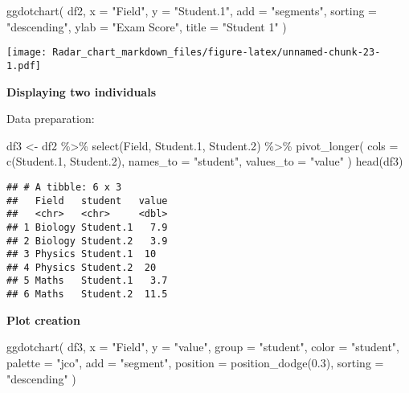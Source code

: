 \documentclass[
]{article}
\newenvironment{Shaded}{\begin{snugshade}}{\end{snugshade}}
\newcommand{\AttributeTok}[1]{\textcolor[rgb]{0.77,0.63,0.00}{#1}}
\newcommand{\FloatTok}[1]{\textcolor[rgb]{0.00,0.00,0.81}{#1}}
\newcommand{\FunctionTok}[1]{\textcolor[rgb]{0.00,0.00,0.00}{#1}}
\newcommand{\NormalTok}[1]{#1}
\newcommand{\OtherTok}[1]{\textcolor[rgb]{0.56,0.35,0.01}{#1}}
\newcommand{\SpecialCharTok}[1]{\textcolor[rgb]{0.00,0.00,0.00}{#1}}
\newcommand{\StringTok}[1]{\textcolor[rgb]{0.31,0.60,0.02}{#1}}
\begin{document}
\begin{Shaded}
\begin{Highlighting}[]
\FunctionTok{ggdotchart}\NormalTok{(}
\NormalTok{  df2, }\AttributeTok{x =} \StringTok{"Field"}\NormalTok{, }\AttributeTok{y =} \StringTok{"Student.1"}\NormalTok{,}
  \AttributeTok{add =} \StringTok{"segments"}\NormalTok{, }\AttributeTok{sorting =} \StringTok{"descending"}\NormalTok{,}
  \AttributeTok{ylab =} \StringTok{"Exam Score"}\NormalTok{, }\AttributeTok{title =} \StringTok{"Student 1"}
\NormalTok{  )}
\end{Highlighting}
\end{Shaded}

\texttt{[image: Radar\_chart\_markdown\_files/figure-latex/unnamed-chunk-23-1.pdf]}

\textbf{Displaying two individuals}

Data preparation:

\begin{Shaded}
\begin{Highlighting}[]
\NormalTok{df3 }\OtherTok{\textless{}{-}}\NormalTok{ df2 }\SpecialCharTok{\%\textgreater{}\%}
  \FunctionTok{select}\NormalTok{(Field, Student}\FloatTok{.1}\NormalTok{, Student}\FloatTok{.2}\NormalTok{) }\SpecialCharTok{\%\textgreater{}\%}
  \FunctionTok{pivot\_longer}\NormalTok{(}
    \AttributeTok{cols =} \FunctionTok{c}\NormalTok{(Student}\FloatTok{.1}\NormalTok{, Student}\FloatTok{.2}\NormalTok{),}
    \AttributeTok{names\_to =} \StringTok{"student"}\NormalTok{,}
    \AttributeTok{values\_to =} \StringTok{"value"}
\NormalTok{  )}
\FunctionTok{head}\NormalTok{(df3)}
\end{Highlighting}
\end{Shaded}

\begin{verbatim}
## # A tibble: 6 x 3
##   Field   student   value
##   <chr>   <chr>     <dbl>
## 1 Biology Student.1   7.9
## 2 Biology Student.2   3.9
## 3 Physics Student.1  10  
## 4 Physics Student.2  20  
## 5 Maths   Student.1   3.7
## 6 Maths   Student.2  11.5
\end{verbatim}

\textbf{Plot creation}

\begin{Shaded}
\begin{Highlighting}[]
\FunctionTok{ggdotchart}\NormalTok{(}
\NormalTok{  df3, }\AttributeTok{x =} \StringTok{"Field"}\NormalTok{, }\AttributeTok{y =} \StringTok{"value"}\NormalTok{, }
  \AttributeTok{group =} \StringTok{"student"}\NormalTok{, }\AttributeTok{color =} \StringTok{"student"}\NormalTok{, }\AttributeTok{palette =} \StringTok{"jco"}\NormalTok{,}
  \AttributeTok{add =} \StringTok{"segment"}\NormalTok{, }\AttributeTok{position =} \FunctionTok{position\_dodge}\NormalTok{(}\FloatTok{0.3}\NormalTok{),}
  \AttributeTok{sorting =} \StringTok{"descending"}
\NormalTok{  )}
\end{Highlighting}
\end{Shaded}
\end{document}
